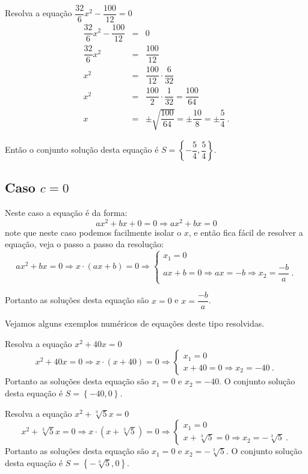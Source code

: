  \begin{exem}
  Resolva a equação $\dfrac{32}{6}x^2 - \dfrac{100}{12}=0$
   \begin{eqnarray*}
   \dfrac{32}{6}x^2 - \dfrac{100}{12} &=& 0 \\
   \dfrac{32}{6}x^2 &=& \dfrac{100}{12} \\
   x^2 &=& \dfrac{100}{12} \cdot \dfrac{6}{32} \\
   x^2 &=& \dfrac{100}{2} \cdot \dfrac{1}{32} = \dfrac{100}{64} \\
   x &=& \pm \sqrt{\dfrac{100}{64}} = \pm \dfrac{10}{8} = \pm \dfrac{5}{4} \ .
   \end{eqnarray*}

 Então o conjunto solução desta equação é $S= \left\{-\dfrac{5}{4}, \dfrac{5}{4} \right\}$.
 \end{exem}

 \subsection{Caso \texorpdfstring{$c=0$}{c=0}}

 Neste caso a equação é da forma:
\begin{equation}
ax^2 + bx + 0= 0 \Rightarrow ax^2 + bx= 0
\end{equation}
 note que neste caso podemos facilmente isolar o $x$, e então fica fácil de resolver a equação, veja o passo a passo da resolução:
 \[ax^2 + bx= 0 \Rightarrow x \cdot (ax + b)= 0 \Rightarrow
 \begin{cases}
 x_1= 0 \\
 ax+b=0 \Rightarrow ax= -b \Rightarrow x_2= \dfrac{-b}{a} \ .
 \end{cases}
  \]

 Portanto as soluções desta equação são $x= 0$ e $x= \dfrac{-b}{a}$.

 Vejamos alguns exemplos numéricos de equações deste tipo resolvidas.
 
 \begin{exem}
  Resolva a equação $x^2 + 40x=0$
 \[x^2 + 40x=0 \Rightarrow x \cdot (x+ 40)= 0 \Rightarrow
 \begin{cases}
 x_1=0 \\
 x+40=0 \Rightarrow x_2= -40 \ .
 \end{cases}
 \]
 Portanto as soluções desta equação são $x_1= 0$ e $x_2= -40$. O conjunto solução desta equação é $S= \left\{ -40, 0 \right\}$.
\end{exem}

 \begin{exem}
  Resolva a equação $x^2 + \sqrt[3]{5}x=0$
 \[x^2 + \sqrt[3]{5}x=0 \Rightarrow x \cdot (x+ \sqrt[3]{5})= 0 \Rightarrow
 \begin{cases}
 x_1=0 \\
 x+\sqrt[3]{5}=0 \Rightarrow x_2= -\sqrt[3]{5} \ .
 \end{cases}
 \]
 Portanto as soluções desta equação são $x_1= 0$ e $x_2= -\sqrt[3]{5}$. O conjunto solução desta equação é $S= \left\{ -\sqrt[3]{5}, 0 \right\}$.
 \end{exem}

